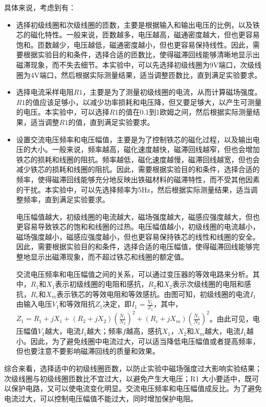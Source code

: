 \documentclass[dvipsnames, svgnames,a4paper,11pt]{article}
\begin{document}
	具体来说，考虑到有：
	\begin{itemize}
		\item 选择初级线圈和次级线圈的匝数，主要是根据输入和输出电压的比例，以及铁芯的磁化特性。一般来说，匝数越多，电压越高，磁通密度越大，但也更容易饱和。匝数越少，电压越低，磁通密度越小，但也更容易保持线性。因此，需要根据实验目的和条件，选择合适的匝数比，使得磁滞回线能够清晰地显示出磁滞现象，而不失去细节。本实验中，可以先选择初级线圈为9V端口，次级线圈为4V端口，然后根据实际测量结果，适当调整匝数比，直到满足实验要求。
		
		\item 选择电流采样电阻$R1$，主要是为了测量初级线圈的电流，从而计算磁场强度。$R1$的值应该足够小，以减少功率损耗和电压降，但又要足够大，以产生可测量的电压。本实验中，可以选择$R1$的值在0.1到1欧姆之间，然后根据实际测量结果，适当调整$R1$的值，直到满足实验要求。
		
		\item 设置交流电压频率和电压幅值，主要是为了控制铁芯的磁化过程，以及输出电压的大小。一般来说，频率越高，磁化速度越快，磁滞回线越窄，但也会增加铁芯的损耗和线圈的阻抗。频率越低，磁化速度越慢，磁滞回线越宽，但也会减少铁芯的损耗和线圈的阻抗。因此，需要根据实验目的和条件，选择合适的频率，使得磁滞回线能够充分地反映出铁磁材料的磁滞特性，而不受其他因素的干扰。本实验中，可以先选择频率为5Hz，然后根据实际测量结果，适当调整频率，直到满足实验要求。
		
		电压幅值越大，初级线圈的电流越大，磁场强度越大，磁感应强度越大，但也更容易导致铁芯的饱和和线圈的过热。电压幅值越小，初级线圈的电流越小，磁场强度越小，磁感应强度越小，但也更容易保持铁芯的线性和线圈的安全。因此，需要根据实验目的和条件，选择合适的电压幅值，使得磁滞回线能够完整地显示出磁滞现象，而不超过铁芯和线圈的额定值。
		
		交流电压频率和电压幅值之间的关系，可以通过变压器的等效电路来分析。其中，$R_1$和$X_1$表示初级线圈的电阻和感抗，$R_2$和$X_2$表示次级线圈的电阻和感抗，$R_c$和$X_m$表示铁芯的等效电阻和等效感抗。由图可知，初级线圈的电流$I_1$由输入电压$V_1$和等效阻抗$Z_1$决定，即$I_1 = \frac{V_1}{Z_1}$，其中，$Z_1 = R_1 + jX_1 + (R_2 + jX_2)\left(\frac{N_1}{N_2}\right)^2 + (R_c + jX_m)\left(\frac{N_1}{N_2}\right)^2$。由此可见，电压幅值$V_1$越大，电流$I_1$越大；频率$f$越高，感抗$X_1$，$X_2$和$X_m$越大，电流$I_1$越小。因此，为了避免线圈中电流过大，可以适当降低电压幅值或者提高频率，但也要注意不要影响磁滞回线的质量和效果。		
	\end{itemize}
	
	综合来看，选择适中的初级线圈匝数，以防止实验中磁场强度过大影响实验结果；次级线圈与初级线圈匝数比不宜过大，以避免产生大电压；R1 大小要适中，既可以保护电路，又可以使电流变化明显。交流电压频率和电压幅值成反比。为了避免电流过大，可以控制电压幅值不能过大，同时增加保护电阻。
	
\end{document}
